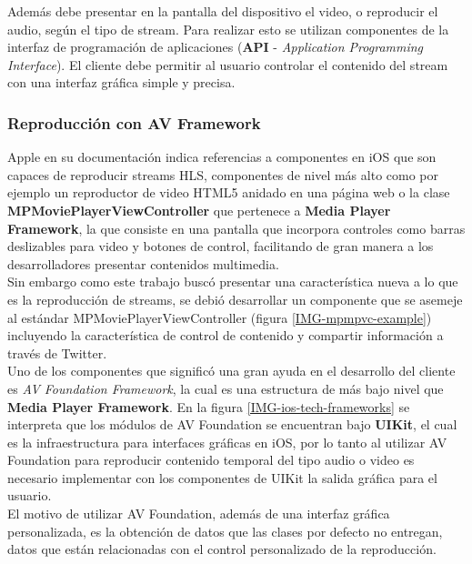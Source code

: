 Además debe presentar en la pantalla del dispositivo el video, o reproducir el audio, según el tipo de stream. Para realizar esto se utilizan componentes de la interfaz de programación de aplicaciones (\textbf{API} - \textit{Application Programming Interface}). El cliente debe permitir al usuario controlar el contenido del stream con una interfaz gráfica simple y precisa.

		\subsubsection{Reproducción con AV Framework}
Apple en su documentación indica referencias a componentes en iOS que son capaces de reproducir streams HLS, componentes de nivel más alto como por ejemplo un reproductor de video HTML5 anidado en una página web o la clase \textbf{MPMoviePlayerViewController} que pertenece a \textbf{Media Player Framework}, la que consiste en una pantalla que incorpora controles como barras deslizables para video y botones de control, facilitando de gran manera a los desarrolladores presentar contenidos multimedia. \\

Sin embargo como este trabajo buscó presentar una característica nueva a lo que es la reproducción de streams, se debió desarrollar un componente que se asemeje al estándar MPMoviePlayerViewController (figura \ref{IMG-mpmpvc-example}) incluyendo la característica de control de contenido y compartir información a través de Twitter.\\

Uno de los componentes que significó una gran ayuda en el desarrollo del cliente es \textit{AV Foundation Framework}, la cual es una estructura de más bajo nivel que \textbf{Media Player Framework}. 
En la figura \ref{IMG-ios-tech-frameworks} se interpreta que los módulos de AV Foundation se encuentran bajo \textbf{UIKit}, el cual es la infraestructura para interfaces gráficas en iOS, por lo tanto al utilizar AV Foundation para reproducir contenido temporal del tipo audio o video es necesario implementar con los componentes de UIKit la salida gráfica para el usuario.\\

El motivo de utilizar AV Foundation, además de una interfaz gráfica personalizada, es la obtención de datos que las clases por defecto no entregan, datos que están relacionadas con el control personalizado de la reproducción.


